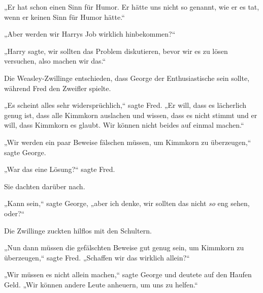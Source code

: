 „Er hat schon einen Sinn für Humor. Er hätte uns nicht so genannt, wie er es tat, wenn er keinen Sinn für Humor hätte.“

„Aber werden wir Harrys Job wirklich hinbekommen?“

„Harry sagte, wir sollten das Problem diskutieren, bevor wir es zu lösen versuchen, also machen wir das.“

Die Weasley-Zwillinge entschieden, dass George der Enthusiastische sein sollte, während Fred den Zweifler spielte.

„Es scheint alles sehr widersprüchlich,“ sagte Fred. „Er will, dass es lächerlich genug ist, dass alle Kimmkorn auslachen und wissen, dass es nicht stimmt und er will, dass Kimmkorn es glaubt. Wir können nicht beides auf einmal machen.“

„Wir werden ein paar Beweise fälschen müssen, um Kimmkorn zu überzeugen,“ sagte George.

„War das eine Lösung?“ sagte Fred.

Sie dachten darüber nach.

„Kann sein,“ sagte George, „aber ich denke, wir sollten das nicht \emph{so} eng sehen, oder?“

Die Zwillinge zuckten hilflos mit den Schultern.

„Nun dann müssen die gefälschten Beweise gut genug sein, um Kimmkorn zu überzeugen,“ sagte Fred. „Schaffen wir das wirklich allein?“

„Wir müssen es nicht allein machen,“ sagte George und deutete auf den Haufen Geld. „Wir können andere Leute anheuern, um uns zu helfen.“

